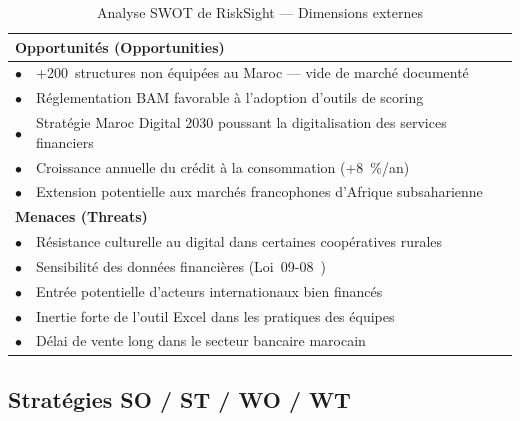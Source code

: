 \documentclass[12pt, a4paper]{report}
\begin{document}
\begin{table}[H]
\centering
\caption{Analyse SWOT de RiskSight --- Dimensions externes}
\label{tab:swot_externe}
\renewcommand{\arraystretch}{1.4}
\begin{tabularx}{\textwidth}{p{0.5cm} X}
\toprule
\multicolumn{2}{l}{\cellcolor{primary!12}\textbf{\textcolor{primary}{Opportunités (Opportunities)}}} \\
\midrule
$\bullet$ & +200~structures non équipées au Maroc --- vide de marché documenté \\
$\bullet$ & Réglementation BAM favorable à l'adoption d'outils de scoring \\
$\bullet$ & Stratégie Maroc Digital 2030 poussant la digitalisation des services financiers \\
$\bullet$ & Croissance annuelle du crédit à la consommation (+8~\%/an) \\
$\bullet$ & Extension potentielle aux marchés francophones d'Afrique subsaharienne \\
\midrule
\multicolumn{2}{l}{\cellcolor{secondary!15}\textbf{\textcolor{secondary}{Menaces (Threats)}}} \\
\midrule
$\bullet$ & Résistance culturelle au digital dans certaines coopératives rurales \\
$\bullet$ & Sensibilité des données financières (Loi~09-08~\cite{loi0908}) \\
$\bullet$ & Entrée potentielle d'acteurs internationaux bien financés \\
$\bullet$ & Inertie forte de l'outil Excel dans les pratiques des équipes \\
$\bullet$ & Délai de vente long dans le secteur bancaire marocain \\
\bottomrule
\end{tabularx}
\end{table}

\subsection{Stratégies SO / ST / WO / WT}
\end{document}
